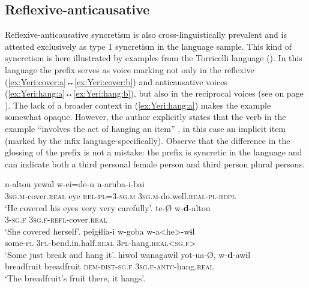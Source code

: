\subsection{Reflexive-anticausative} \label{sec:simple-syncretism:refl-antc}
Reflexive-anticausative syncretism is also cross-linguistically prevalent and is attested exclusively as type 1 syncretism in the language sample. This kind of syncretism is here illustrated by examples from the Torricelli language  (). In this language the prefix  serves as voice marking not only in the reflexive (\ref{ex:Yeri:cover:a}↔\ref{ex:Yeri:cover:b}) and anticausative voices (\ref{ex:Yeri:hang:a}↔\ref{ex:Yeri:hang:b}), but also in the reciprocal voices (see  on page \pageref{tab:ch5:middle}). The lack of a broader context in (\ref{ex:Yeri:hang:a}) makes the example somewhat opaque. However, the author explicitly states that the verb in the example “involves the act of hanging an item” \citep[370]{wilson:2017}, in this case an implicit item (marked by the infix  language-specifically). Observe that the difference in the glossing of the prefix  is not a mistake: the prefix is syncretic in the language and can indicate both a third personal female person and third person plural persons.

\ea {} \citep[369f., 451]{wilson:2017}
\ea\label{ex:Yeri:cover:a}
	\gll	n-altou yewal w-ei=de-n n-aruba-i-bai \\
			\textsc{3sg.m}-cover.\textsc{real} eye \textsc{rel-pl=3-sg.m} \textsc{3sg.m}-do.well.\textsc{real-pl-rdpl} \\
	\glt	‘He covered his eyes very very carefully’.
\ex\label{ex:Yeri:cover:b}
	\gll	te-Ø w-\textbf{d}-altou \\
			\textsc{3-sg.f} \textsc{3sg.f-refl}-cover.\textsc{real} \\
	\glt	‘She covered herself’.
\ex\label{ex:Yeri:hang:a}
	\gll	peigɨlia-i w-goba w-a<he>-wɨl \\
			some-\textsc{pl} \textsc{3pl}-bend.in.half.\textsc{real} \textsc{3pl}-hang.\textsc{real<sg.f>} \\
	\glt	‘Some just break and hang it’.
\ex\label{ex:Yeri:hang:b}
	\gll	hɨwol wanagawɨl yot-ua-Ø, w-\textbf{d}-awɨl \\
			breadfruit breadfruit \textsc{dem-dist-sg.f} \textsc{3sg.f-antc}-hang.\textsc{real} \\
	\glt	‘The breadfruit's fruit there, it hangs’.
	\z 
\z

